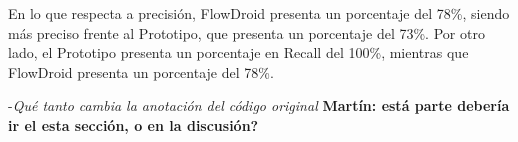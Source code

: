En lo que respecta a precisión, FlowDroid presenta un porcentaje del 78\%,
siendo más preciso frente al Prototipo, que presenta un porcentaje del
73\%.\newline 
Por otro lado, el Prototipo presenta un porcentaje en Recall del 100\%,
mientras que FlowDroid presenta un porcentaje del 78\%.


-\textit{Qué tanto cambia la anotación del código original}
\textbf{Martín: está parte debería ir el esta sección, o en la discusión?}

























